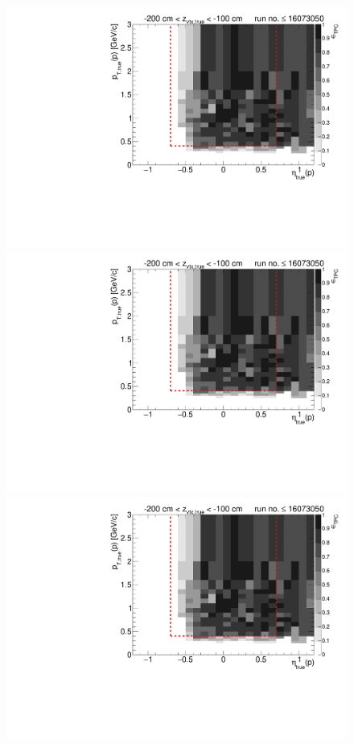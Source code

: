 \begin{figure}[hb]\ContinuedFloat
\centering
\parbox{0.495\textwidth}{
  \centering
  \includegraphics[width=\linewidth,page=11]{graphics/eff/Eff2D_TPC_proton_Plus_RunRange1.pdf}\\
  \includegraphics[width=\linewidth,page=13]{graphics/eff/Eff2D_TPC_proton_Plus_RunRange1.pdf}\\
  \includegraphics[width=\linewidth,page=15]{graphics/eff/Eff2D_TPC_proton_Plus_RunRange1.pdf}\\
}
\end{figure}
